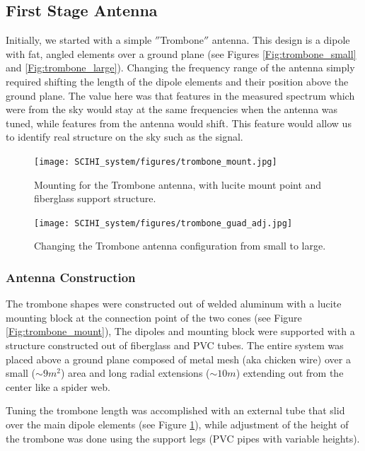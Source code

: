 \subsection{First Stage Antenna}
Initially, we started with a simple $''$Trombone$''$ antenna. This design is a dipole with fat, angled elements over a ground plane (see Figures \ref{Fig:trombone_small} and \ref{Fig:trombone_large}). Changing the frequency range of the antenna simply required shifting the length of the dipole elements and their position above the ground plane. The value here was that features in the measured spectrum which were from the sky would stay at the same frequencies when the antenna was tuned, while features from the antenna would shift. This feature would allow us to identify real structure on the sky such as the \cm signal. 

\begin{figure}[htb]
\centering
\begin{minipage}[b]{0.53\textwidth}
\centering
\texttt{[image: SCIHI\_system/figures/trombone\_mount.jpg]}
\caption{Mounting for the Trombone antenna, with lucite mount point and fiberglass support structure. }
\label{Fig:trombone_mount}
\end{minipage}%
\begin{minipage}[b]{0.02\textwidth}
\hspace{1cm}
\end{minipage}%
\begin{minipage}[b]{0.41\textwidth}
\centering
\texttt{[image: SCIHI\_system/figures/trombone\_guad\_adj.jpg]}
\caption{Changing the Trombone antenna configuration from small to large.}
\label{Fig:trombone_adj}
\end{minipage}
\end{figure}

\subsubsection{Antenna Construction}
The trombone shapes were constructed out of welded aluminum with a lucite mounting block at the connection point of the two cones (see Figure \ref{Fig:trombone_mount}), The dipoles and mounting block were supported with a structure constructed out of fiberglass and PVC tubes. The entire system was placed above a ground plane composed of metal mesh (aka chicken wire) over a small ($\sim9 m^2$) area and long radial extensions ($\sim10 m$) extending out from the center like a spider web. 

Tuning the trombone length was accomplished with an external tube that slid over the main dipole elements (see Figure \ref{Fig:trombone_adj}), while adjustment of the height of the trombone was done using the support legs (PVC pipes with variable heights).

